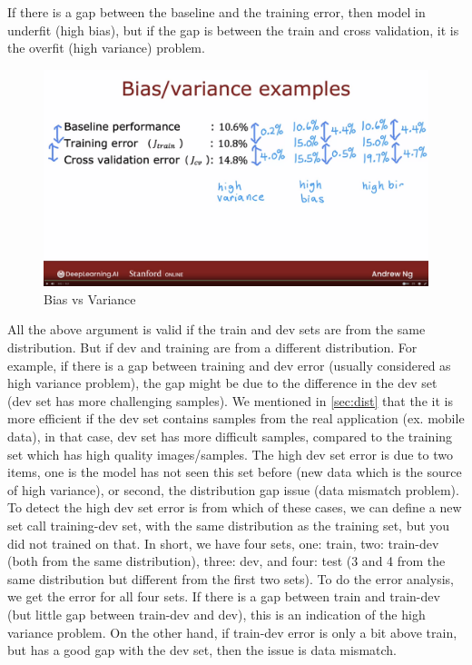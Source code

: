 \documentclass[12pt]{report}
\begin{document}
If there is a gap between the baseline and the training error, then model in underfit (high bias), but if the gap is between the train and cross validation, it is the overfit (high variance) problem.


\begin{figure}[H]
  \centering
  \includegraphics[trim =0.0cm 0.0cm 0.0cm 0.0cm, clip, scale=0.12]{pics/biasVariance2.png}
  \caption{Bias vs Variance}
\end{figure}


All the above argument is valid if the train and dev sets are from the same distribution. But if dev and training are from a different distribution. For example, if there is a gap between training and dev error (usually considered as high variance problem), the gap might be due to the difference in the dev set (dev set has more challenging samples). We mentioned in \ref{sec:dist} that the it is more efficient if the dev set contains samples from the real application (ex. mobile data), in that case, dev set has more difficult samples, compared to the training set which has high quality images/samples. The high dev set error is due to two items, one is the model has not seen this set before (new data which is the source of high variance), or second, the distribution gap issue (data mismatch problem). To detect the high dev set error is from which of these cases, we can define a new set call training-dev set, with the same distribution as the training set, but you did not trained on that. In short, we have four sets,  one: train, two: train-dev (both from the same distribution), three: dev, and four: test (3 and 4 from the same distribution but different from the first two sets). To do the error analysis, we get the error for all four sets. If there is a gap between train and train-dev (but little gap between train-dev and dev), this is an indication of the high variance problem. On the other hand, if train-dev error is only a bit above train, but has a good gap with the dev set, then the issue is data mismatch.
\end{document}
